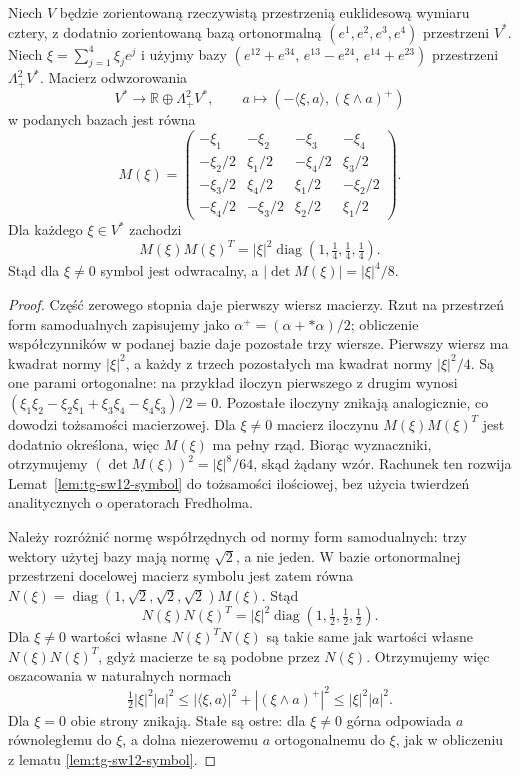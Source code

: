 \begin{lemat}
\label{lem:tg-sw12-symbol-matrix}
Niech $V$ będzie zorientowaną rzeczywistą przestrzenią
euklidesową wymiaru cztery, z dodatnio zorientowaną
bazą ortonormalną $(e^1,e^2,e^3,e^4)$ przestrzeni $V^*$.
Niech $\xi=\sum_{j=1}^4\xi_je^j$ i użyjmy bazy
$(e^{12}+e^{34},\,e^{13}-e^{24},\,e^{14}+e^{23})$
przestrzeni $\Lambda^2_+V^*$.
Macierz odwzorowania
\[
V^*\longrightarrow\mathbb R\oplus\Lambda^2_+V^*,
\qquad a\longmapsto
(-\langle\xi,a\rangle,(\xi\wedge a)^+)
\]
w podanych bazach jest równa
\[
M(\xi)=\begin{pmatrix}
-\xi_1&-\xi_2&-\xi_3&-\xi_4\\
-\xi_2/2&\xi_1/2&-\xi_4/2&\xi_3/2\\
-\xi_3/2&\xi_4/2&\xi_1/2&-\xi_2/2\\
-\xi_4/2&-\xi_3/2&\xi_2/2&\xi_1/2
\end{pmatrix}.
\]
Dla każdego $\xi\in V^*$ zachodzi
\[
M(\xi)M(\xi)^T
=|\xi|^2\operatorname{diag}(1,\tfrac14,\tfrac14,\tfrac14).
\]
Stąd dla $\xi\ne0$ symbol jest odwracalny,
a $|\det M(\xi)|=|\xi|^4/8$.
\end{lemat}

\begin{proof}
Część zerowego stopnia daje pierwszy wiersz macierzy.
Rzut na przestrzeń form samodualnych zapisujemy jako
$\alpha^+=(\alpha+*\alpha)/2$; obliczenie współczynników
w podanej bazie daje pozostałe trzy wiersze.
Pierwszy wiersz ma kwadrat normy $|\xi|^2$,
a każdy z trzech pozostałych ma kwadrat normy
$|\xi|^2/4$. Są one parami ortogonalne:
na przykład iloczyn pierwszego z drugim wynosi
$(\xi_1\xi_2-\xi_2\xi_1+
\xi_3\xi_4-\xi_4\xi_3)/2=0$.
Pozostałe iloczyny znikają analogicznie,
co dowodzi tożsamości macierzowej.
Dla $\xi\ne0$ macierz iloczynu
$M(\xi)M(\xi)^T$ jest dodatnio określona,
więc $M(\xi)$ ma pełny rząd.
Biorąc wyznaczniki, otrzymujemy
$(\det M(\xi))^2=|\xi|^8/64$,
skąd żądany wzór.
Rachunek ten rozwija Lemat~\ref{lem:tg-sw12-symbol}
do tożsamości ilościowej, bez użycia
twierdzeń analitycznych o operatorach Fredholma.

Należy rozróżnić normę współrzędnych od normy
form samodualnych: trzy wektory użytej bazy
mają normę $\sqrt2$, a nie jeden.
W bazie ortonormalnej przestrzeni docelowej
macierz symbolu jest zatem równa
$N(\xi)=\operatorname{diag}(1,\sqrt2,\sqrt2,\sqrt2)M(\xi)$.
Stąd
\[
N(\xi)N(\xi)^T=|\xi|^2
\operatorname{diag}(1,\tfrac12,\tfrac12,\tfrac12).
\]
Dla $\xi\ne0$ wartości własne $N(\xi)^TN(\xi)$
są takie same jak wartości własne $N(\xi)N(\xi)^T$,
gdyż macierze te są podobne przez $N(\xi)$.
Otrzymujemy więc oszacowania w naturalnych normach
\[
\tfrac12|\xi|^2|a|^2
\leq |\langle\xi,a\rangle|^2+|(\xi\wedge a)^+|^2
\leq |\xi|^2|a|^2.
\]
Dla $\xi=0$ obie strony znikają. Stałe są ostre:
dla $\xi\ne0$ górna odpowiada $a$ równoległemu
do $\xi$, a dolna niezerowemu $a$ ortogonalnemu
do $\xi$, jak w obliczeniu
z lematu \ref{lem:tg-sw12-symbol}.
\end{proof}

